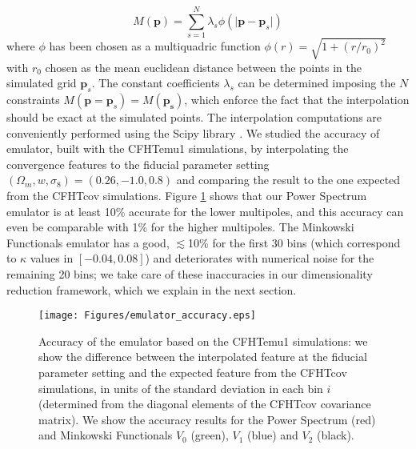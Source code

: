 \documentclass[reprint,aps,prd,superscriptaddress,showkeys,showpacs]{revtex4-1}
\begin{document}
\begin{equation}
M(\mathbf{p}) = \sum_{s=1}^N \lambda_s\phi(\vert\mathbf{p}-\mathbf{p}_s\vert)
\end{equation}
%
where $\phi$ has been chosen as a multiquadric function $\phi(r)=\sqrt{1+(r/r_0)^2}$ with $r_0$ chosen as the mean euclidean distance between the points in the simulated grid $\mathbf{p}_s$. The constant coefficients $\lambda_s$ can be determined imposing the $N$ constraints $M(\mathbf{p}=\mathbf{p}_s)=M(\mathbf{p_s})$, which enforce the fact that the interpolation should be exact at the simulated points. The interpolation computations are conveniently performed using the Scipy library \citep{scipy}. We studied the accuracy of emulator, built with the CFHTemu1 simulations, by interpolating the convergence features to the fiducial parameter setting $(\Omega_m,w,\sigma_8)=(0.26,-1.0,0.8)$ and comparing the result to the one expected from the CFHTcov simulations. Figure \ref{emulatorAccuracy} shows that our Power Spectrum emulator is at least 10\% accurate for the lower multipoles, and this accuracy can even be comparable with 1\% for the higher multipoles. The Minkowski Functionals emulator has a good, $\lesssim$10\% for the first 30 bins (which correspond to $\kappa$ values in $[-0.04,0.08]$) and deteriorates with numerical noise for the remaining 20 bins; we take care of these inaccuracies in our dimensionality reduction framework, which we explain in the next section. 

\begin{figure}
\begin{center}
\texttt{[image: Figures/emulator\_accuracy.eps]}
\end{center}
\caption{Accuracy of the emulator based on the CFHTemu1 simulations: we show the difference between the interpolated feature at the fiducial parameter setting and the expected feature from the CFHTcov simulations, in units of the standard deviation in each bin $i$ (determined from the diagonal elements of the CFHTcov covariance matrix). We show the accuracy results for the Power Spectrum (red) and Minkowski Functionals $V_0$ (green), $V_1$ (blue) and $V_2$ (black).}
\label{emulatorAccuracy}
\end{figure}  
\end{document}
